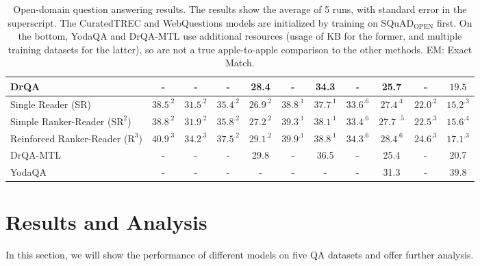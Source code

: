 \documentclass[letterpaper]{article} %
\begin{document}
\begin{table*}[t]
\begin{tabular}{lcccccccccc}
DrQA~\cite{chen2017reading}             & -             & -             & -             & 28.4  & -                & 34.3        & -                & 25.7             & -                & $\mathbf{19.5}$                         \\
\midrule
Single Reader (SR)    & $\text{38.5}^{.2}$          & $\text{31.5}^{.2}$          & $\text{35.4}^{.2}$         & $\text{26.9}^{.2}$   & $\text{38.8}^{.1}$           & $\text{37.7}^{.1}$       & $\text{33.6}^{.6}$            & $\text{27.4}^{.4}$           & $\text{22.0}^{.2}$            & $\text{15.2}^{.3}$                         \\
Simple Ranker-Reader ($\text{SR}^2$)       & ${38.8}^{.2} $         & $\text{31.9}^{.2}$          & $\text{35.8}^{.2}$          & $\text{27.2}^{.2}$         & $\text{39.3}^{.1}$              & $\text{38.1}^{.1}$  & $\text{33.4}^{.6}$            & $\text{27.7 }^{.5}$             & $\text{22.5}^{.3} $            & ${15.6 }^{.4}$                          \\
Reinforced Ranker-Reader ($\text{R}^3$)  & $\mathbf{40.9}^{.3}$ & $\mathbf{34.2}^{.3}$ & $\mathbf{37.5}^{.2}$ & $\mathbf{29.1}^{.2}$ & $\mathbf{39.9}^{.1}$    & $\mathbf{38.8}^{.1}$ & $\mathbf{34.3}^{.6}$    & $\mathbf{28.4}^{.6}$    & $\mathbf{24.6}^{.3}$    & $\text{17.1}^{.3}$      \\
\hline
\hline
DrQA-MTL~\cite{chen2017reading}               & -             & -             & -             & 29.8     & -                & 36.5     & -                & 25.4             & -                & 20.7                         \\
YodaQA~\cite{baudivs2015modeling}           & -             & -             & -             & -          & -           & -                & -      & 31.3             & -                & 39.8                        \\
\bottomrule
\end{tabular}
\normalsize
\caption{Open-domain question answering results. The results show the average of 5 runs, with standard error in the superscript.  The CuratedTREC and WebQuestions models are initialized by training on SQuAD$_{\textrm{OPEN}}$ first. On the bottom, YodaQA and DrQA-MTL use additional resources (usage of KB for the former, and multiple training datasets for the latter), so are not a true apple-to-apple comparison to the other methods. EM: Exact Match.  }
\label{tab:results}
\end{table*}

\section{Results and Analysis}
In this section, we will show the performance of different models on five QA datasets and offer further analysis. 
\end{document}
